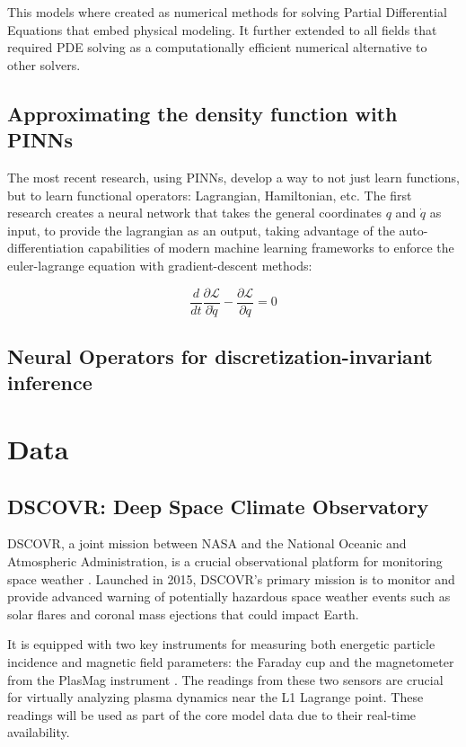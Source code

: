 \documentclass[12pt]{article}
\begin{document}
This models where created as numerical methods for solving Partial Differential Equations that embed physical modeling. It further extended to all fields that required PDE solving as a computationally efficient numerical alternative to other solvers.


\subsection{Approximating the density function with PINNs}
The most recent research, using PINNs, develop a way to not just learn functions, but to learn functional operators: Lagrangian, Hamiltonian, etc. \cite{cranmer2020lagrangianneuralnetworks, greydanus2019hamiltonianneuralnetworks} The first research creates a neural network that takes the general coordinates $q$ and $\dot q$ as input, to provide the lagrangian as an output, taking advantage of the auto-differentiation capabilities of modern machine learning frameworks to enforce the euler-lagrange equation with gradient-descent methods:

\begin{equation}
    \frac{d}{dt} \frac{\partial \mathcal{L}}{\partial \dot q} - \frac{\partial \mathcal{L}}{\partial q} = 0
\end{equation}

\subsection{Neural Operators for discretization-invariant inference}


\section{Data}

\subsection{DSCOVR: Deep Space Climate Observatory}
DSCOVR, a joint mission between NASA and the National Oceanic and Atmospheric Administration, is a crucial observational platform for monitoring space weather \cite{nasa_dscovr}. Launched in 2015, DSCOVR's primary mission is to monitor and provide advanced warning of potentially hazardous space weather events such as solar flares and coronal mass ejections that could impact Earth.

It is equipped with two key instruments for measuring both energetic particle incidence and magnetic field parameters: the Faraday cup and the magnetometer from the PlasMag instrument \cite{nasa_dscovr}. The readings from these two sensors are crucial for virtually analyzing plasma dynamics near the L1 Lagrange point. These readings will be used as part of the core model data due to their real-time availability.
\end{document}
